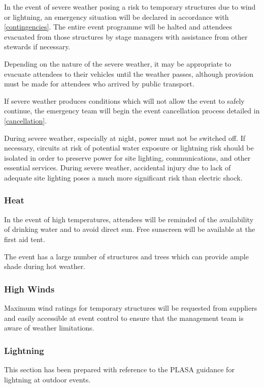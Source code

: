In the event of severe weather posing a risk to temporary structures due to wind or
lightning, an emergency situation will be declared in accordance with
\cref{contingencies}. The entire event programme will be halted and attendees
evacuated from those structures by stage managers with assistance from other stewards
if necessary.

Depending on the nature of the severe weather, it may be appropriate to evacuate attendees
to their vehicles until the weather passes, although provision must be made for attendees
who arrived by public transport.

If severe weather produces conditions which will not allow the event to safely continue,
the emergency team will begin the event cancellation process detailed in
\cref{cancellation}.

During severe weather, especially at night, power must not be switched off. If
necessary, circuits at risk of potential water exposure or lightning risk should be isolated in
order to preserve power for site lighting, communications, and other essential services.
During severe weather, accidental injury due to lack of adequate site lighting poses a
much more significant risk than electric shock.

\subsubsection{Heat}

In the event of high temperatures, attendees will be reminded of the availability of drinking
water and to avoid direct sun. Free sunscreen will be available at the first aid tent.

The event has a large number of structures and trees which can provide ample shade during
hot weather.

\subsubsection{High Winds}

Maximum wind ratings for temporary structures will be requested from suppliers and
easily accessible at event control to ensure that the management team is aware of weather
limitations.

\subsubsection{Lightning}

This section has been prepared with reference to the PLASA guidance for lightning at
outdoor events\cite{plasalightning}.


